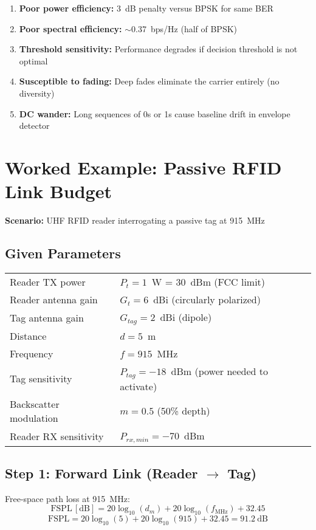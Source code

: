 \begin{enumerate}
\item \textbf{Poor power efficiency:} 3~dB penalty versus BPSK for same BER
\item \textbf{Poor spectral efficiency:} $\sim$0.37~bps/Hz (half of BPSK)
\item \textbf{Threshold sensitivity:} Performance degrades if decision threshold is not optimal
\item \textbf{Susceptible to fading:} Deep fades eliminate the carrier entirely (no diversity)
\item \textbf{DC wander:} Long sequences of 0s or 1s cause baseline drift in envelope detector
\end{enumerate}

\section{Worked Example: Passive RFID Link Budget}

\textbf{Scenario:} UHF RFID reader interrogating a passive tag at 915~MHz

\subsection*{Given Parameters}

\begin{tabular}{@{}ll@{}}
Reader TX power & $P_t = 1$~W = 30~dBm (FCC limit) \\
Reader antenna gain & $G_t = 6$~dBi (circularly polarized) \\
Tag antenna gain & $G_{tag} = 2$~dBi (dipole) \\
Distance & $d = 5$~m \\
Frequency & $f = 915$~MHz \\
Tag sensitivity & $P_{tag} = -18$~dBm (power needed to activate) \\
Backscatter modulation & $m = 0.5$ (50\% depth) \\
Reader RX sensitivity & $P_{rx,min} = -70$~dBm \\
\end{tabular}

\subsection*{Step 1: Forward Link (Reader $\rightarrow$ Tag)}

Free-space path loss at 915~MHz:
\begin{equation}
\mathrm{FSPL\,[dB]} = 20\log_{10}(d_m) + 20\log_{10}(f_{\text{MHz}}) + 32.45
\end{equation}
\begin{equation}
\mathrm{FSPL} = 20\log_{10}(5) + 20\log_{10}(915) + 32.45 = 91.2~\text{dB}
\end{equation}

